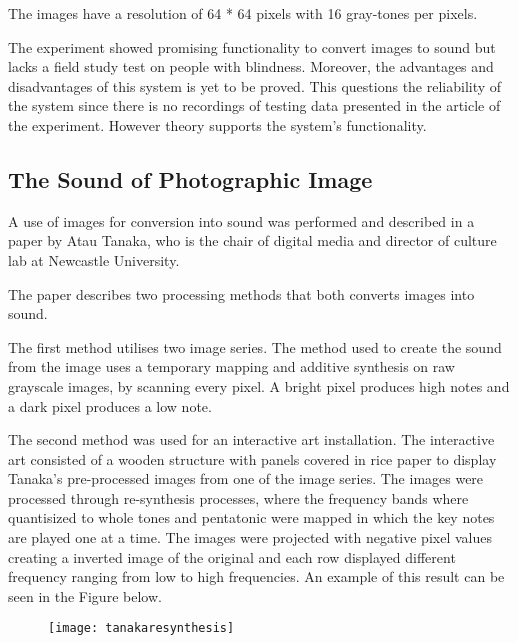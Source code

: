   
The images have a resolution of 64 * 64 pixels with 16 gray-tones per pixels.  

The experiment showed promising functionality to convert images to sound but lacks a field study test on people with blindness. Moreover, the advantages and disadvantages of this system is yet to be proved. This questions the reliability of the system since there is no recordings of testing data presented in the article of the experiment. However theory supports the system's functionality.  

\subsection{The Sound of Photographic Image}\label{sec:soundarticle}

A use of images for conversion into sound was performed and described in a paper by Atau Tanaka, who is the chair of digital media and director of culture lab at Newcastle University\cite{Tanaka2012}.

The paper describes two processing methods that both converts images into sound.

The first method utilises two image series. The method used to create the sound from the image uses a temporary mapping and additive synthesis on raw grayscale images, by scanning every pixel. A bright pixel produces high notes and a dark pixel produces a low note. 

The second method was used for an interactive art installation. The interactive art consisted of a wooden structure with panels covered in rice paper to display Tanaka's pre-processed images from one of the image series. The images were processed through re-synthesis processes, where the frequency bands where quantisized to whole tones and pentatonic were mapped in which the key notes are played one at a time. The images were projected with negative pixel values creating a inverted image of the original and each row displayed different frequency ranging from low to high frequencies. An example of this result can be seen in the Figure below.  

\begin{figure}[!h]
\centering
\texttt{[image: tanakaresynthesis]}
\caption{\label{fig:tanakaresynthesis}\cite{Tanaka2012}}
\end{figure}


